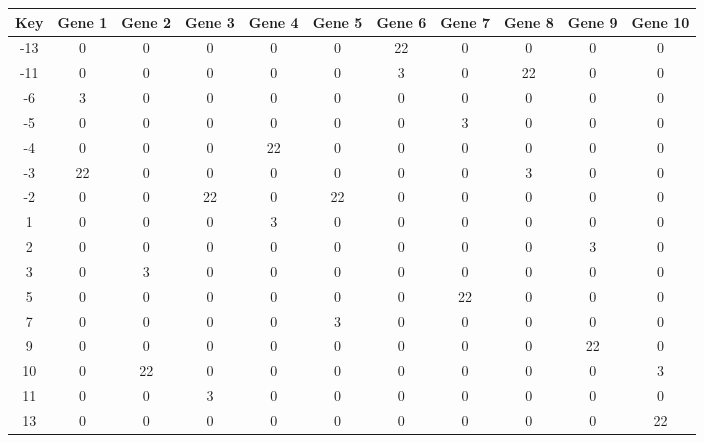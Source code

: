\begin{tabular}{|c|c|c|c|c|c|c|c|c|c|c|}
\hline
Key & Gene 1 & Gene 2 & Gene 3 & Gene 4 & Gene 5 & Gene 6 & Gene 7 & Gene 8 & Gene 9 & Gene 10 \\
\hline
-13 & 0 & 0 & 0 & 0 & 0 & 22 & 0 & 0 & 0 & 0 \\
-11 & 0 & 0 & 0 & 0 & 0 & 3 & 0 & 22 & 0 & 0 \\
-6 & 3 & 0 & 0 & 0 & 0 & 0 & 0 & 0 & 0 & 0 \\
-5 & 0 & 0 & 0 & 0 & 0 & 0 & 3 & 0 & 0 & 0 \\
-4 & 0 & 0 & 0 & 22 & 0 & 0 & 0 & 0 & 0 & 0 \\
-3 & 22 & 0 & 0 & 0 & 0 & 0 & 0 & 3 & 0 & 0 \\
-2 & 0 & 0 & 22 & 0 & 22 & 0 & 0 & 0 & 0 & 0 \\
1 & 0 & 0 & 0 & 3 & 0 & 0 & 0 & 0 & 0 & 0 \\
2 & 0 & 0 & 0 & 0 & 0 & 0 & 0 & 0 & 3 & 0 \\
3 & 0 & 3 & 0 & 0 & 0 & 0 & 0 & 0 & 0 & 0 \\
5 & 0 & 0 & 0 & 0 & 0 & 0 & 22 & 0 & 0 & 0 \\
7 & 0 & 0 & 0 & 0 & 3 & 0 & 0 & 0 & 0 & 0 \\
9 & 0 & 0 & 0 & 0 & 0 & 0 & 0 & 0 & 22 & 0 \\
10 & 0 & 22 & 0 & 0 & 0 & 0 & 0 & 0 & 0 & 3 \\
11 & 0 & 0 & 3 & 0 & 0 & 0 & 0 & 0 & 0 & 0 \\
13 & 0 & 0 & 0 & 0 & 0 & 0 & 0 & 0 & 0 & 22 \\
\hline
\end{tabular}